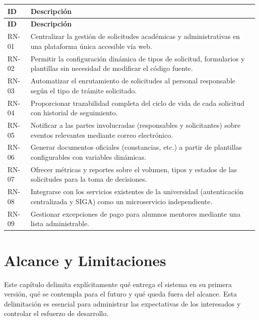 \documentclass[12pt,letterpaper]{report}
\begin{document}
\begin{longtable}{|C{1.6cm}|L{12cm}|}
    \hline
    \textbf{ID} & \textbf{Descripción} \\
    \hline
    \endfirsthead
    \hline
    \textbf{ID} & \textbf{Descripción} \\
    \hline
    \endhead
    \hline
    \endfoot

    RN-01 & Centralizar la gestión de solicitudes académicas y administrativas en una plataforma única accesible vía web. \\
    \hline
    RN-02 & Permitir la configuración dinámica de tipos de solicitud, formularios y plantillas sin necesidad de modificar el código fuente. \\
    \hline
    RN-03 & Automatizar el enrutamiento de solicitudes al personal responsable según el tipo de trámite solicitado. \\
    \hline
    RN-04 & Proporcionar trazabilidad completa del ciclo de vida de cada solicitud con historial de seguimiento. \\
    \hline
    RN-05 & Notificar a las partes involucradas (responsables y solicitantes) sobre eventos relevantes mediante correo electrónico. \\
    \hline
    RN-06 & Generar documentos oficiales (constancias, etc.) a partir de plantillas configurables con variables dinámicas. \\
    \hline
    RN-07 & Ofrecer métricas y reportes sobre el volumen, tipos y estados de las solicitudes para la toma de decisiones. \\
    \hline
    RN-08 & Integrarse con los servicios existentes de la universidad (autenticación centralizada y SIGA) como un microservicio independiente. \\
    \hline
    RN-09 & Gestionar excepciones de pago para alumnos mentores mediante una lista administrable. \\
    \hline
\end{longtable}

\chapter{Alcance y Limitaciones}

Este capítulo delimita explícitamente qué entrega el sistema en su primera versión, qué se contempla para el futuro y qué queda fuera del alcance. Esta delimitación es esencial para administrar las expectativas de los interesados y controlar el esfuerzo de desarrollo.
\end{document}
